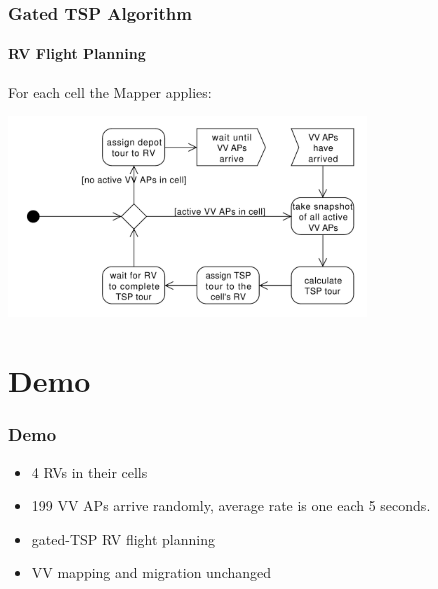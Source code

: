 \documentclass{beamer}
\begin{document}
\begin{frame}\frametitle{Gated TSP Algorithm}\framesubtitle{RV Flight Planning }
% 
% 

For each cell the Mapper applies:

        \begin{center}
                {\includegraphics[width=9.5cm]{policy-2.pdf}}
        \end{center}

\end{frame}

\section{Demo}

\begin{frame}\frametitle{Demo} %

  \begin{itemize}
    \item 4 RVs in their cells
    \item 199 VV APs arrive randomly, average rate is one each 5 seconds.
    \item gated-TSP RV flight planning
    \item VV mapping and migration unchanged
  \end{itemize}

\end{frame}
\end{document}
